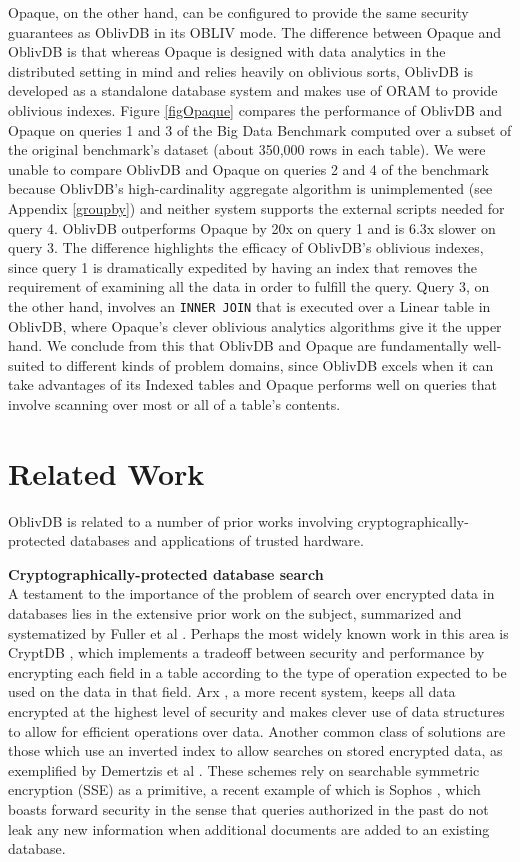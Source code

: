 \documentclass[USenglish,oneside,twocolumn]{article}
\def\name/{OblivDB}
\begin{document}
Opaque, on the other hand, can be configured to provide the same security guarantees as \name/ in its OBLIV mode. The difference between Opaque and \name/ is that whereas Opaque is designed with data analytics in the distributed setting in mind and relies heavily on oblivious sorts, \name/ is developed as a standalone database system and makes use of ORAM to provide oblivious indexes. Figure \ref{figOpaque} compares the performance of \name/ and Opaque on queries 1 and 3 of the Big Data Benchmark \cite{BDB} computed over a subset of the original benchmark's dataset (about 350,000 rows in each table). We were unable to compare \name/ and  Opaque on queries 2 and 4 of the benchmark because \name/'s high-cardinality aggregate algorithm is unimplemented (see Appendix \ref{groupby}) and neither system supports the external scripts needed for query 4. \name/ outperforms Opaque by 20x on query 1 and is 6.3x slower on query 3. The difference highlights the efficacy of \name/'s oblivious indexes, since query 1 is dramatically expedited by having an index that removes the requirement of examining all the data in order to fulfill the query. Query 3, on the other hand, involves an \texttt{INNER JOIN} that is executed over a Linear table in \name/, where Opaque's clever oblivious analytics algorithms give it the upper hand. We conclude from this that \name/ and Opaque are fundamentally well-suited to different kinds of problem domains, since \name/ excels when it can take advantages of its Indexed tables and Opaque performs well on queries that involve scanning over most or all of a table's contents. 


\section{Related Work}\label{related}

\name/ is related to a number of prior works involving cryptographically-protected databases and applications of trusted hardware.

\medskip \noindent \textbf{Cryptographically-protected database search}\\
A testament to the importance of the problem of search over encrypted data in databases lies in the extensive prior work on the subject, summarized and systematized by Fuller et al \cite{FVY+17}. Perhaps the most widely known work in this area is CryptDB \cite{PRZB12}, which implements a tradeoff between security and performance by encrypting each field in a table according to the type of operation expected to be used on the data in that field. Arx \cite{PBP16}, a more recent system, keeps all data encrypted at the highest level of security and makes clever use of data structures to allow for efficient operations over data. Another common class of solutions are those which use an inverted index to allow searches on stored encrypted data, as exemplified by Demertzis et al \cite{DPP+16}. These schemes rely on searchable symmetric encryption (SSE) as a primitive, a recent example of which is Sophos \cite{Bost16}, which boasts forward security in the sense that queries authorized in the past do not leak any new information when additional documents are added to an existing database. 
\end{document}
